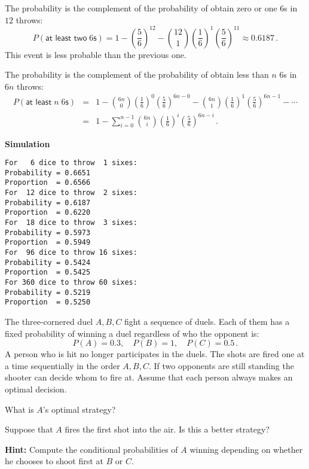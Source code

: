  The probability is the complement of the probability of obtain zero or one $6$s in $12$ throws:
\[
P(\textsf{at least two}\;6\textsf{s})=1-\left(\frac{5}{6}\right)^{12}-{12\choose 1}\left(\frac{1}{6}\right)^{1}\left(\frac{5}{6}\right)^{11}\approx 0.6187\,.
\]
This event is less probable than the previous one.

 The probability is the complement of the probability of obtain less than $n$ $6$s in $6n$ throws:
\begin{eqnarray*}
P(\textsf{at least}\;n\;6\textsf{s})&=&
  1-{6n \choose 0}\left(\frac{1}{6}\right)^0\left(\frac{5}{6}\right)^{6n-0}-
  {6n\choose 1}\left(\frac{1}{6}\right)^{1}\left(\frac{5}{6}\right)^{6n-1}-\cdots\\
&=&1-\sum_{i=0}^{n-1}{6n\choose i}\left(\frac{1}{6}\right)^{i}\left(\frac{5}{6}\right)^{6n-i}\,.
\end{eqnarray*}

\textbf{Simulation}
\begin{verbatim}
For   6 dice to throw  1 sixes:
Probability = 0.6651
Proportion  = 0.6566
For  12 dice to throw  2 sixes:
Probability = 0.6187
Proportion  = 0.6220
For  18 dice to throw  3 sixes:
Probability = 0.5973
Proportion  = 0.5949
For  96 dice to throw 16 sixes:
Probability = 0.5424
Proportion  = 0.5425
For 360 dice to throw 60 sixes:
Probability = 0.5219
Proportion  = 0.5250
\end{verbatim}


\begin{prob}{The three-cornered duel}
$A,B,C$ fight a sequence of duels. Each of them has a fixed probability of winning a duel regardless of who the opponent is:
\[
P(A)=0.3,\quad P(B)=1, \quad P(C)=0.5\,.
\]
A person who is hit no longer participates in the duels. The shots are fired one at a time sequentially in the order $A,B,C$. If two opponents are still standing the shooter can decide whom to fire at. Assume that each person always makes an optimal decision.

 What is $A$'s optimal strategy?

 Suppose that $A$ fires the first shot into the air. Is this a better strategy?

\textbf{Hint:} Compute the conditional probabilities of $A$ winning depending on whether he chooses to shoot first at $B$ or $C$.
\end{prob}

\solution{}

